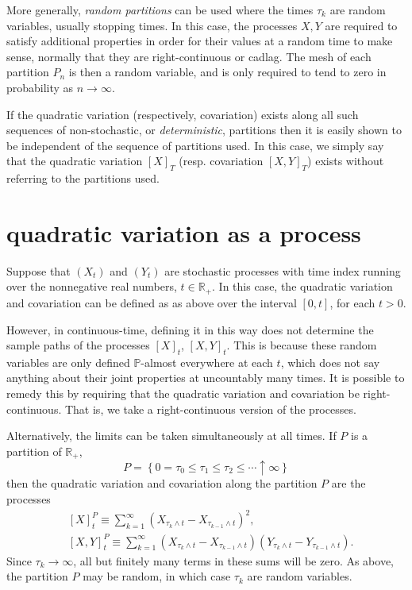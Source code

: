 \documentclass[12pt]{article}
\begin{document}
More generally, \emph{random partitions} can be used where the times $\tau_k$ are random variables, usually stopping times. In this case, the processes $X,Y$ are required to satisfy additional properties in order for their values at a random time to make sense, normally that they are right-continuous or cadlag. The mesh of each partition $P_n$ is then a random variable, and is only required to tend to zero in probability as $n\rightarrow\infty$.

If the quadratic variation (respectively, covariation) exists along all such sequences of non-stochastic, or \emph{deterministic}, partitions then it is easily shown to be independent of the sequence of partitions used. In this case, we simply say that the quadratic variation $[X]_T$ (resp. covariation $[X,Y]_T$) exists without referring to the partitions used.

\section{quadratic variation as a process}

Suppose that $(X_t)$ and $(Y_t)$ are stochastic processes with time index running over the nonnegative real numbers, $t\in\mathbb{R}_+$. In this case, the quadratic variation and covariation can be defined as as above over the interval $[0,t]$, for each $t>0$.

However, in continuous-time, defining it in this way does not determine the sample paths of the processes $[X]_t$, $[X,Y]_t$. This is because these random variables are only defined $\mathbb{P}$-almost everywhere at each $t$, which does not say anything about their joint properties at uncountably many times. It is possible to remedy this by requiring that the quadratic variation and covariation be right-continuous. That is, we take a right-continuous version of the processes.

Alternatively, the limits can be taken simultaneously at all times. If $P$ is a partition of $\mathbb{R}_+$,
\begin{equation*}
P=\left\{0=\tau_0\le\tau_1\le\tau_2\le\cdots\uparrow\infty\right\}
\end{equation*}
then the quadratic variation and covariation along the partition $P$ are the processes
\begin{align*}
&[X]^P_t\equiv\sum_{k=1}^\infty\left(X_{\tau_k\wedge t}-X_{\tau_{k-1}\wedge t}\right)^2,\\
&[X,Y]^P_t\equiv\sum_{k=1}^\infty\left(X_{\tau_k\wedge t}-X_{\tau_{k-1}\wedge t}\right)\left(Y_{\tau_k\wedge t}-Y_{\tau_{k-1}\wedge t}\right).
\end{align*}
Since $\tau_k\rightarrow\infty$, all but finitely many terms in these sums will be zero. As above, the partition $P$ may be random, in which case $\tau_k$ are random variables.
\end{document}
